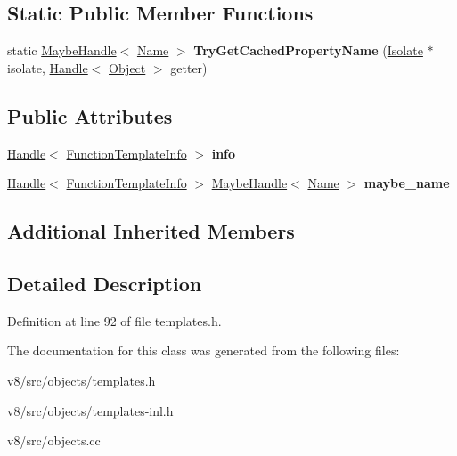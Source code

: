 \subsection*{Static Public Member Functions}
\begin{DoxyCompactItemize}
\item 
\mbox{\label{classv8_1_1internal_1_1FunctionTemplateInfo_ad8ca48a0b08efa7299f264446e3a14f3}} 
static \mbox{\hyperlink{classv8_1_1internal_1_1MaybeHandle}{Maybe\+Handle}}$<$ \mbox{\hyperlink{classv8_1_1internal_1_1Name}{Name}} $>$ {\bfseries Try\+Get\+Cached\+Property\+Name} (\mbox{\hyperlink{classv8_1_1internal_1_1Isolate}{Isolate}} $\ast$isolate, \mbox{\hyperlink{classv8_1_1internal_1_1Handle}{Handle}}$<$ \mbox{\hyperlink{classv8_1_1internal_1_1Object}{Object}} $>$ getter)
\end{DoxyCompactItemize}
\subsection*{Public Attributes}
\begin{DoxyCompactItemize}
\item 
\mbox{\label{classv8_1_1internal_1_1FunctionTemplateInfo_aef62fddc1c69c70325a53b521ef931be}} 
\mbox{\hyperlink{classv8_1_1internal_1_1Handle}{Handle}}$<$ \mbox{\hyperlink{classv8_1_1internal_1_1FunctionTemplateInfo}{Function\+Template\+Info}} $>$ {\bfseries info}
\item 
\mbox{\label{classv8_1_1internal_1_1FunctionTemplateInfo_a5dc33349d1f23ec90a69516284d52293}} 
\mbox{\hyperlink{classv8_1_1internal_1_1Handle}{Handle}}$<$ \mbox{\hyperlink{classv8_1_1internal_1_1FunctionTemplateInfo}{Function\+Template\+Info}} $>$ \mbox{\hyperlink{classv8_1_1internal_1_1MaybeHandle}{Maybe\+Handle}}$<$ \mbox{\hyperlink{classv8_1_1internal_1_1Name}{Name}} $>$ {\bfseries maybe\+\_\+name}
\end{DoxyCompactItemize}
\subsection*{Additional Inherited Members}


\subsection{Detailed Description}


Definition at line 92 of file templates.\+h.



The documentation for this class was generated from the following files\+:\begin{DoxyCompactItemize}
\item 
v8/src/objects/templates.\+h\item 
v8/src/objects/templates-\/inl.\+h\item 
v8/src/objects.\+cc\end{DoxyCompactItemize}

